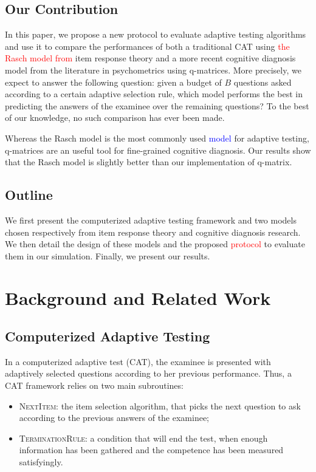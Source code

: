 \documentclass{sig-alternate}
\newcommand\alert[1]{\textcolor{red}{#1}}
\newcommand\note[1]{\textcolor{blue}{#1}}
\begin{document}
\subsection{Our Contribution}

In this paper, we propose a new protocol to evaluate adaptive testing algorithms and use it to compare the performances of both a traditional CAT using \alert{the Rasch model from} item response theory and a more recent cognitive diagnosis model from the literature in psychometrics using q-matrices. More precisely, we expect to answer the following question: given a budget of $B$ questions asked according to a certain adaptive selection rule, which model performs the best in predicting the answers of the examinee over the remaining questions? To the best of our knowledge, no such comparison has ever been made.

Whereas the Rasch model is the most commonly used \note{model} for adaptive testing, q-matrices are an useful tool for fine-grained cognitive diagnosis. Our results show that the Rasch model is slightly better than our implementation of q-matrix.

\subsection{Outline}

We first present the computerized adaptive testing framework and two models chosen respectively from item response theory and cognitive diagnosis research. We then detail the design of these models and the proposed \alert{protocol} to evaluate them in our simulation. Finally, we present our results.

\section{Background and Related Work}

\subsection{Computerized Adaptive Testing}

In a computerized adaptive test (CAT), the examinee is presented with adaptively selected questions according to her previous performance. Thus, a CAT framework relies on two main subroutines:
\begin{itemize}
\item \textsc{NextItem}: the item selection algorithm, that picks the next question to ask according to the previous answers of the examinee;
\item \textsc{TerminationRule}: a condition that will end the test, when enough information has been gathered and the competence has been measured satisfyingly.
\end{itemize}
\end{document}
